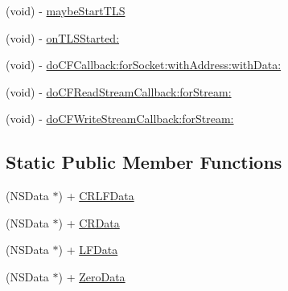 \begin{DoxyCompactItemize}
\item 
(void) -\/ \hyperlink{interface_async_t_c_p_socket_a1bc43cb9e0ad8f6e03562838e3a61c9e}{maybeStartTLS}
\item 
(void) -\/ \hyperlink{interface_async_t_c_p_socket_af833895f05627897d47ccf45c64f4b33}{onTLSStarted:}
\item 
(void) -\/ \hyperlink{interface_async_t_c_p_socket_a5d84ad90d68f42e2c9af6c8f68965aa0}{doCFCallback:forSocket:withAddress:withData:}
\item 
(void) -\/ \hyperlink{interface_async_t_c_p_socket_a5c00764bc41180585415cd80715e4934}{doCFReadStreamCallback:forStream:}
\item 
(void) -\/ \hyperlink{interface_async_t_c_p_socket_a3948e96628b6afc50f175f5343b35ab6}{doCFWriteStreamCallback:forStream:}
\end{DoxyCompactItemize}
\subsection*{Static Public Member Functions}
\begin{DoxyCompactItemize}
\item 
(NSData $\ast$) + \hyperlink{interface_async_t_c_p_socket_a6d7dfcd7967c0e16b86ae64e5579b709}{CRLFData}
\item 
(NSData $\ast$) + \hyperlink{interface_async_t_c_p_socket_adde78bb75988b51f5c403daebcd91f99}{CRData}
\item 
(NSData $\ast$) + \hyperlink{interface_async_t_c_p_socket_a9f80c130183f3fa0f324c7505127ab77}{LFData}
\item 
(NSData $\ast$) + \hyperlink{interface_async_t_c_p_socket_aa051f54bdd6c087a6b4a51c799dbc68b}{ZeroData}
\end{DoxyCompactItemize}
